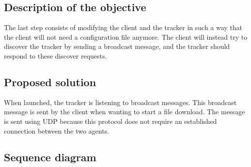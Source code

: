 \subsection{Description of the objective}

The last step consists of modifying the client and the tracker in such a way that the client will not need a configuration file anymore. The client will instead try to discover the tracker by sending a broadcast message, and the tracker should respond to these discover requests.

\subsection{Proposed solution}

When launched, the tracker is listening to broadcast messages. This broadcast message is sent by the client when wanting to start a file download. The message is sent using UDP because this protocol does not require an established connection between the two agents.

\subsection{Sequence diagram}

